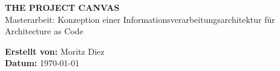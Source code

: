 \documentclass[a4paper, landscape, 10pt]{article}
\begin{document}
\begin{minipage}{0.7\textwidth}
    {\huge \textbf{THE PROJECT CANVAS}} \\
    {\large Masterarbeit: Konzeption einer Informationsverarbeitungsarchitektur für \glqq Architecture as Code\grqq}
\end{minipage}
\hfill
\begin{minipage}{0.25\textwidth}
    \raggedleft
    \textbf{Erstellt von:} Moritz Diez \\
    \textbf{Datum:} \today
\end{minipage}

\vspace{0.5cm}

\end{document}
